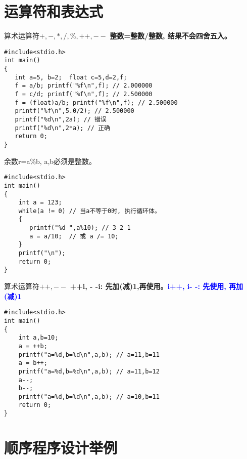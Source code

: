 \section{运算符和表达式}

\begin{frame}[fragile]{算术运算符$+, -, *, /, \%, ++, --$}
\textbf{整数=整数/整数, 结果不会四舍五入。}
\begin{lstlisting}
#include<stdio.h>           
int main()                   
{                            
   int a=5, b=2;  float c=5,d=2,f;
   f = a/b; printf("%f\n",f); // 2.000000
   f = c/d; printf("%f\n",f); // 2.500000
   f = (float)a/b; printf("%f\n",f); // 2.500000
   printf("%f\n",5.0/2); // 2.500000
   printf("%d\n",2a); // 错误
   printf("%d\n",2*a); // 正确
   return 0;           
}                            
\end{lstlisting}
\end{frame}

\begin{frame}[fragile]{余数r=a\%b, a,b必须是整数。}
\begin{lstlisting}
#include<stdio.h>           
int main()                   
{                            
    int a = 123;
    while(a != 0) // 当a不等于0时, 执行循环体。
    {
       printf("%d ",a%10); // 3 2 1
       a = a/10;  // 或 a /= 10;
    }
    printf("\n");
    return 0;           
}                            
\end{lstlisting}
\end{frame}

\begin{frame}[fragile]{算术运算符$++,--$}
\textbf{++i, - -i: 先加(减)1,再使用。}\textcolor{blue}{\textbf{i++, i- -: 先使用, 再加(减)1}}
\begin{lstlisting}
#include<stdio.h>           
int main()                   
{                            
    int a,b=10;
    a = ++b;
    printf("a=%d,b=%d\n",a,b); // a=11,b=11  
    a = b++;
    printf("a=%d,b=%d\n",a,b); // a=11,b=12
    a--;
    b--;
    printf("a=%d,b=%d\n",a,b); // a=10,b=11
    return 0;           
}                            
\end{lstlisting}
\end{frame}

\section{顺序程序设计举例}

